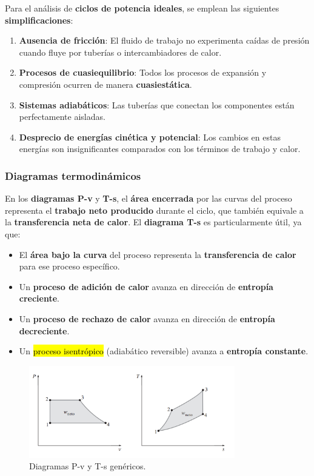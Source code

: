 \documentclass{article}
\begin{document}
    Para el análisis de \textbf{ciclos de potencia ideales}, se emplean las siguientes \textbf{simplificaciones}:

    \begin{enumerate}
        \item \textbf{Ausencia de fricción}: El fluido de trabajo no experimenta caídas de presión cuando fluye por tuberías o intercambiadores de calor.
        \item \textbf{Procesos de cuasiequilibrio}: Todos los procesos de expansión y compresión ocurren de manera \textbf{cuasiestática}.
        \item \textbf{Sistemas adiabáticos}: Las tuberías que conectan los componentes están perfectamente aisladas.
        \item \textbf{Desprecio de energías cinética y potencial}: Los cambios en estas energías son insignificantes comparados con los términos de trabajo y calor.
    \end{enumerate}

    \subsubsection{Diagramas termodinámicos}

    En los \textbf{diagramas P-v} y \textbf{T-s}, el \textbf{área encerrada} por las curvas del proceso representa el \textbf{trabajo neto producido} durante el ciclo, que también equivale a la \textbf{transferencia neta de calor}. El \textbf{diagrama T-s} es particularmente útil, ya que:

    \begin{itemize}
        \item El \textbf{área bajo la curva} del proceso representa la \textbf{transferencia de calor} para ese proceso específico.
        \item Un \textbf{proceso de adición de calor} avanza en dirección de \textbf{entropía creciente}.
        \item Un \textbf{proceso de rechazo de calor} avanza en dirección de \textbf{entropía decreciente}.
        \item Un \hl{proceso isentrópico} (adiabático reversible) avanza a \textbf{entropía constante}.
    \end{itemize}

    \begin{figure}[H]
        \centering
        \includegraphics[width=0.8\textwidth]{Pasted_image_20250803091726.png}
        \caption{Diagramas P-v y T-s genéricos.}
        \label{fig:diagramas_genericos}
    \end{figure}
\end{document}
